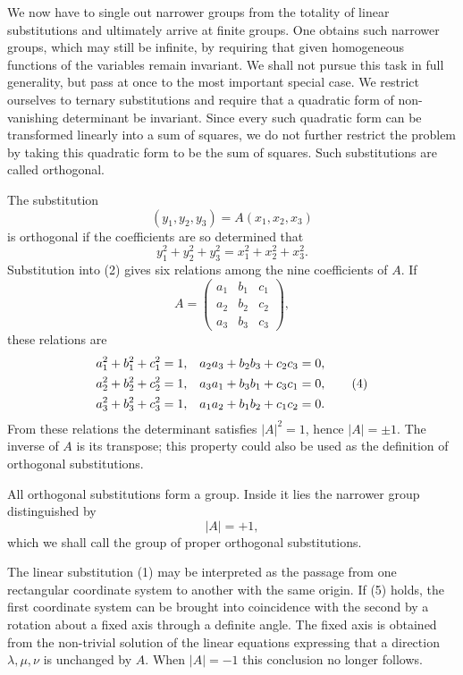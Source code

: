 \documentclass[11pt]{article}
\begin{document}
We now have to single out narrower groups from the totality of linear substitutions and ultimately arrive at finite groups. One obtains such narrower groups, which may still be infinite, by requiring that given homogeneous functions of the variables remain invariant. We shall not pursue this task in full generality, but pass at once to the most important special case. We restrict ourselves to ternary substitutions and require that a quadratic form of non-vanishing determinant be invariant. Since every such quadratic form can be transformed linearly into a sum of squares, we do not further restrict the problem by taking this quadratic form to be the sum of squares. Such substitutions are called orthogonal.

The substitution
\begin{equation}
(y_1,y_2,y_3)=A(x_1,x_2,x_3)
\tag{1}
\end{equation}
is orthogonal if the coefficients are so determined that
\begin{equation}
y_1^2+y_2^2+y_3^2=x_1^2+x_2^2+x_3^2.
\tag{2}
\end{equation}
Substitution into (2) gives six relations among the nine coefficients of $A$. If
\begin{equation}
A=\begin{pmatrix}a_1&b_1&c_1\\a_2&b_2&c_2\\a_3&b_3&c_3\end{pmatrix},
\tag{3}
\end{equation}
these relations are
\begin{align}
a_1^2+b_1^2+c_1^2&=1,& a_2a_3+b_2b_3+c_2c_3&=0,\notag\\
a_2^2+b_2^2+c_2^2&=1,& a_3a_1+b_3b_1+c_3c_1&=0,\tag{4}\\
a_3^2+b_3^2+c_3^2&=1,& a_1a_2+b_1b_2+c_1c_2&=0.\notag
\end{align}
From these relations the determinant satisfies $|A|^2=1$, hence $|A|=\pm1$. The inverse of $A$ is its transpose; this property could also be used as the definition of orthogonal substitutions.

All orthogonal substitutions form a group. Inside it lies the narrower group distinguished by
\begin{equation}
|A|=+1,
\tag{5}
\end{equation}
which we shall call the group of proper orthogonal substitutions.

The linear substitution (1) may be interpreted as the passage from one rectangular coordinate system to another with the same origin. If (5) holds, the first coordinate system can be brought into coincidence with the second by a rotation about a fixed axis through a definite angle. The fixed axis is obtained from the non-trivial solution of the linear equations expressing that a direction $\lambda,\mu,\nu$ is unchanged by $A$. When $|A|=-1$ this conclusion no longer follows.
\end{document}
